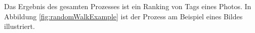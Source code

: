 Das Ergebnis des gesamten Prozesses ist ein Ranking von Tags eines Photos. In Abbildung \ref{fig:randomWalkExample} ist der Prozess am Beispiel eines Bildes illustriert. %





